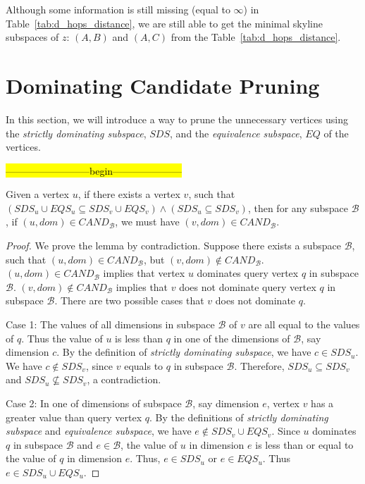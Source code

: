 Although some information is still missing (equal to $\infty$) in Table~\ref{tab:d_hops_distance}, we are still able to get the minimal skyline subspaces of $z$: $(A, B)$ and $(A, C)$ from the Table~\ref{tab:d_hops_distance}.

\section{Dominating Candidate Pruning}

In this section, we will introduce a way to prune the unnecessary vertices using the \emph{strictly dominating subspace}, $\mathit{SDS}$, and the \emph{equivalence subspace}, $\mathit{EQ}$ of the vertices.


\hl{--------------------------begin---------------------}


\begin{lemma}
\label{ppt:prune_cand}
Given a vertex $u$, if there exists a vertex $v$, such that $(SDS_u \cup EQS_u \subseteq SDS_v \cup EQS_v) \wedge (SDS_u \subseteq SDS_v)$, then for any subspace $\mathcal{B}$, if $(u, dom) \in \mathit{CAND}_\mathcal{B}$, we must have $(v, dom) \in \mathit{CAND}_\mathcal{B}$.
\end{lemma}

\begin{proof}
We prove the lemma by contradiction. Suppose there exists a subspace $\mathcal{B}$, such that $(u, dom) \in \mathit{CAND}_\mathcal{B}$, but $(v, dom) \not\in \mathit{CAND}_\mathcal{B}$. $(u, dom) \in \mathit{CAND}_\mathcal{B}$ implies that vertex $u$ dominates query vertex $q$ in subspace $\mathcal{B}$.
$(v, dom) \not\in \mathit{CAND}_\mathcal{B}$ implies that $v$ does not dominate query vertex $q$ in subspace $\mathcal{B}$. There are two possible cases that $v$ does not dominate $q$.

Case 1: The values of all dimensions in subspace $\mathcal{B}$ of $v$ are all equal to the values of $q$. Thus the value of $u$ is less than $q$ in one of the dimensions of $\mathcal{B}$, say dimension $c$. By the definition of \emph{strictly dominating subspace}, we have $c \in SDS_u$. We have $c \notin SDS_v$, since $v$ equals to $q$ in subspace $\mathcal{B}$. Therefore, $SDS_u \subseteq SDS_v$ and $SDS_u \not\subseteq SDS_v$, a contradiction.

Case 2: In one of dimensions of subspace $\mathcal{B}$, say dimension $e$, vertex $v$ has a greater value than query vertex $q$. By the definitions of \emph{strictly dominating subspace} and \emph{equivalence subspace}, we have $e \notin SDS_v \cup EQS_v$. Since $u$ dominates $q$ in subspace $\mathcal{B}$ and $e \in \mathcal{B}$, the value of $u$ in dimension $e$ is less than or equal to the value of $q$ in dimension $e$. Thus, $e \in SDS_u$ or $e \in EQS_u$. Thus $e \in SDS_u \cup EQS_u$.
\end{proof}


